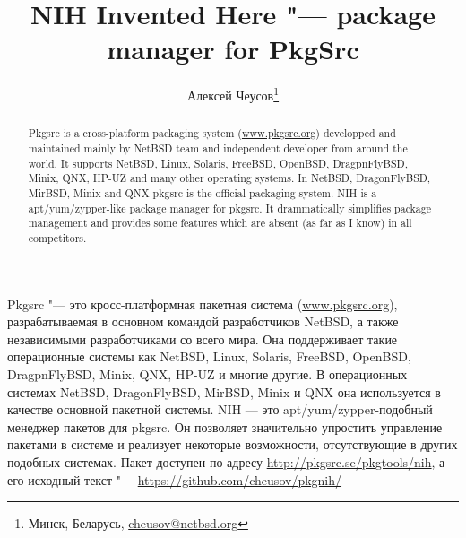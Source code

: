 \documentclass[10pt, a5paper]{article}
\begin{document}
\title{NIH Invented Here "--- package manager for PkgSrc}
\author{Алексей Чеусов\footnote{Минск, Беларусь, \url{cheusov@netbsd.org}}}
\def\progref!#1!{\texttt{#1}}

\maketitle

\begin{abstract}
Pkgsrc is a cross-platform packaging system (\url{www.pkgsrc.org}) developped
and maintained mainly by NetBSD team and independent developer from
around the world. It supports NetBSD, Linux,
Solaris, FreeBSD, OpenBSD, DragpnFlyBSD, Minix, QNX, HP-UZ and many
other operating systems.  In NetBSD, DragonFlyBSD, MirBSD, Minix and QNX
pkgsrc is the official packaging system. NIH is a apt/yum/zypper-like
package manager for pkgsrc.  It drammatically simplifies package
management and provides some features which are absent (as far as I
know) in all competitors.
\end{abstract}

Pkgsrc "--- это кросс-платформная пакетная система (\url{www.pkgsrc.org}),
разрабатываемая в основном командой разработчиков NetBSD, а также
независимыми разработчиками со всего мира. Она поддерживает такие
операционные системы как NetBSD, Linux, Solaris, FreeBSD, OpenBSD,
DragpnFlyBSD, Minix, QNX, HP-UZ и многие другие. В операционных системах
NetBSD, DragonFlyBSD, MirBSD, Minix и QNX она используется в качестве
основной пакетной системы. NIH --- это apt/yum/zypper-подобный менеджер
пакетов для pkgsrc. Он позволяет значительно упростить управление
пакетами в системе и реализует некоторые возможности, отсутствующие в
других подобных системах.
Пакет доступен по адресу \url{http://pkgsrc.se/pkgtools/nih}, а его 
исходный текст "--- \url{https://github.com/cheusov/pkgnih/}
\end{document}

